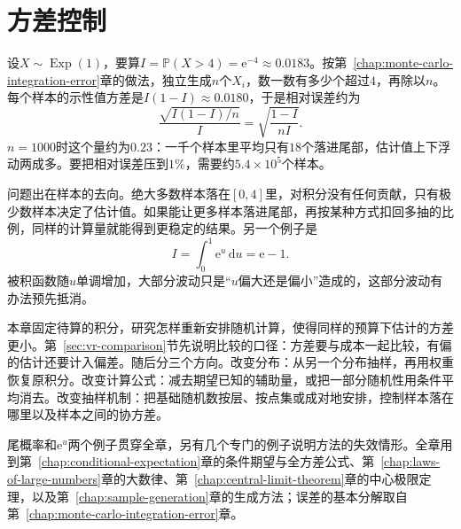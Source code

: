 \chapter{方差控制}
\label{chap:variance-reduction}

设$X\sim\operatorname{Exp}(1)$，要算$I=\mathbb{P}(X>4)=\mathrm{e}^{-4}\approx0.0183$。按第~\ref{chap:monte-carlo-integration-error}章的做法，独立生成$n$个$X_i$，数一数有多少个超过$4$，再除以$n$。每个样本的示性值方差是$I(1-I)\approx0.0180$，于是相对误差约为
\[
 \frac{\sqrt{I(1-I)/n}}{I}=\sqrt{\frac{1-I}{nI}} .
\]
$n=1000$时这个量约为$0.23$：一千个样本里平均只有$18$个落进尾部，估计值上下浮动两成多。要把相对误差压到$1\%$，需要约$5.4\times10^{5}$个样本。

问题出在样本的去向。绝大多数样本落在$[0,4]$里，对积分没有任何贡献，只有极少数样本决定了估计值。如果能让更多样本落进尾部，再按某种方式扣回多抽的比例，同样的计算量就能得到更稳定的结果。另一个例子是
\[
 I=\int_0^1\mathrm{e}^{u}\,\mathrm{d}u=\mathrm{e}-1 .
\]
被积函数随$u$单调增加，大部分波动只是“$u$偏大还是偏小”造成的，这部分波动有办法预先抵消。

本章固定待算的积分，研究怎样重新安排随机计算，使得同样的预算下估计的方差更小。第~\ref{sec:vr-comparison}节先说明比较的口径：方差要与成本一起比较，有偏的估计还要计入偏差。随后分三个方向。改变分布：从另一个分布抽样，再用权重恢复原积分。改变计算公式：减去期望已知的辅助量，或把一部分随机性用条件平均消去。改变抽样机制：把基础随机数按层、按点集或成对地安排，控制样本落在哪里以及样本之间的协方差。

尾概率和$\mathrm{e}^{u}$两个例子贯穿全章，另有几个专门的例子说明方法的失效情形。全章用到第~\ref{chap:conditional-expectation}章的条件期望与全方差公式、第~\ref{chap:laws-of-large-numbers}章的大数律、第~\ref{chap:central-limit-theorem}章的中心极限定理，以及第~\ref{chap:sample-generation}章的生成方法；误差的基本分解取自第~\ref{chap:monte-carlo-integration-error}章。










